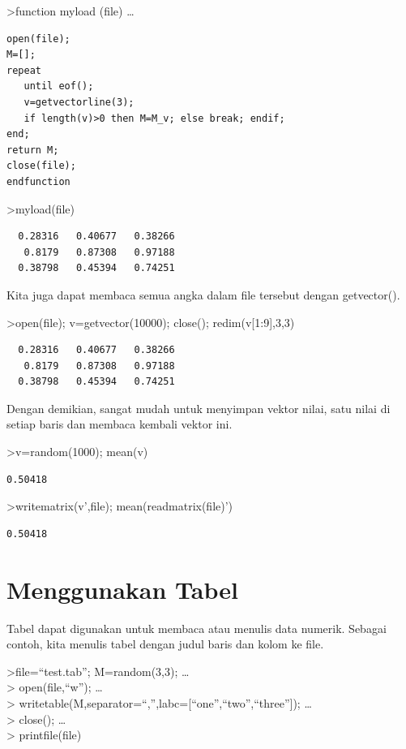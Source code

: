 \documentclass[
]{book}
\begin{document}
\textgreater function myload (file) \ldots{}

\begin{verbatim}
open(file);
M=[];
repeat
   until eof();
   v=getvectorline(3);
   if length(v)>0 then M=M_v; else break; endif;
end;
return M;
close(file);
endfunction
\end{verbatim}

\textgreater myload(file)

\begin{verbatim}
  0.28316   0.40677   0.38266 
   0.8179   0.87308   0.97188 
  0.38798   0.45394   0.74251 
\end{verbatim}

Kita juga dapat membaca semua angka dalam file tersebut dengan getvector().

\textgreater open(file); v=getvector(10000); close(); redim(v{[}1:9{]},3,3)

\begin{verbatim}
  0.28316   0.40677   0.38266 
   0.8179   0.87308   0.97188 
  0.38798   0.45394   0.74251 
\end{verbatim}

Dengan demikian, sangat mudah untuk menyimpan vektor nilai, satu nilai di setiap baris dan membaca kembali vektor ini.

\textgreater v=random(1000); mean(v)

\begin{verbatim}
0.50418
\end{verbatim}

\textgreater writematrix(v',file); mean(readmatrix(file)')

\begin{verbatim}
0.50418
\end{verbatim}

\chapter{Menggunakan Tabel}\label{menggunakan-tabel}

Tabel dapat digunakan untuk membaca atau menulis data numerik. Sebagai contoh, kita menulis tabel dengan judul baris dan kolom ke file.

\textgreater file=``test.tab''; M=random(3,3); \ldots{}\\
\textgreater{} open(file,``w''); \ldots{}\\
\textgreater{} writetable(M,separator=``,'',labc={[}``one'',``two'',``three''{]}); \ldots{}\\
\textgreater{} close(); \ldots{}\\
\textgreater{} printfile(file)
\end{document}

